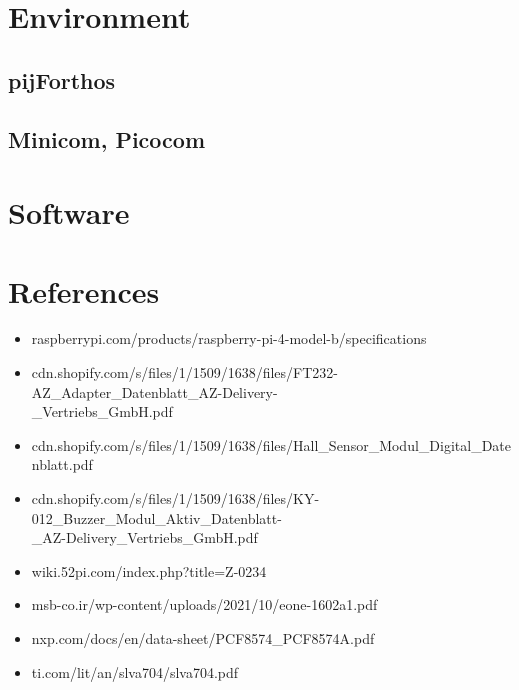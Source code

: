 \documentclass[]{article}
\begin{document}
\section{Environment}

\subsection{pijForthos}

\subsection{Minicom, Picocom}

\section{Software}

\section{References}

\begin{itemize}
    \item raspberrypi.com/products/raspberry-pi-4-model-b/specifications
    \item cdn.shopify.com/s/files/1/1509/1638/files/FT232-AZ\_Adapter\_Datenblatt\_AZ-Delivery-
    \\\_Vertriebs\_GmbH.pdf
    \item cdn.shopify.com/s/files/1/1509/1638/files/Hall\_Sensor\_Modul\_Digital\_Datenblatt.pdf
    \item cdn.shopify.com/s/files/1/1509/1638/files/KY-012\_Buzzer\_Modul\_Aktiv\_Datenblatt-
    \\\_AZ-Delivery\_Vertriebs\_GmbH.pdf
    \item wiki.52pi.com/index.php?title=Z-0234
    \item msb-co.ir/wp-content/uploads/2021/10/eone-1602a1.pdf
    \item nxp.com/docs/en/data-sheet/PCF8574\_PCF8574A.pdf
    \item ti.com/lit/an/slva704/slva704.pdf
\end{itemize}
\end{document}
